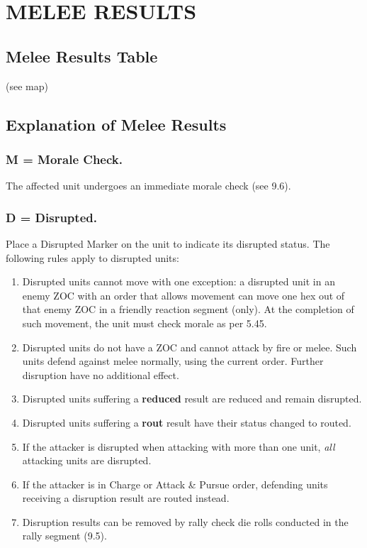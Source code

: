 \section{MELEE RESULTS}
\hfill

\subsection{Melee Results Table} (see map)

\subsection{Explanation of Melee Results}

\subsubsection[Morale Check]{M = Morale Check.} The affected unit undergoes an immediate morale check (see 9.6).

\subsubsection[Disrupted]{D = Disrupted.} Place a Disrupted Marker on the unit to indicate its disrupted status. The following rules apply to disrupted units:

\begin{enumerate}
  \item Disrupted units cannot move with one exception: a disrupted unit in an enemy ZOC with an order that allows movement can move one hex out of that enemy ZOC in a friendly reaction segment (only). At the completion of such movement, the unit must check morale as per 5.45.
  \item Disrupted units do not have a ZOC and cannot attack by fire or melee. Such units defend against melee normally, using the current order. Further disruption have no additional effect.
  \item Disrupted units suffering a \textbf{reduced} result are reduced and remain disrupted.
  \item Disrupted units suffering a \textbf{rout} result have their status changed to routed.
  \item If the attacker is disrupted when attacking with more than one unit, \textit{all} attacking units are disrupted.
    \item If the attacker is in Charge or Attack \& Pursue order, defending units receiving a disruption result are routed instead.
  \item Disruption results can be removed by rally check die rolls conducted in the rally segment (9.5).
\end{enumerate}

